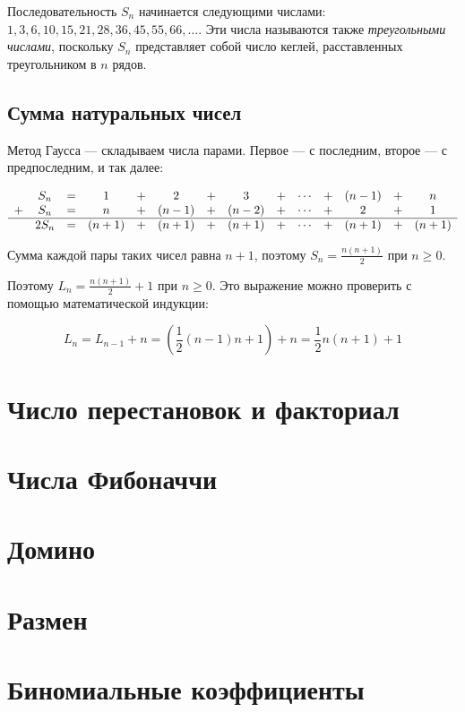 \documentclass[14pt]{book}
\begin{document}
Последовательность $S_n$ начинается следующими числами: $1, 3, 6, 10, 15, 21, 28, 36, 45, 55, 66, \ldots$.
Эти числа называются также \emph{треугольными числами}, поскольку $S_n$ представляет собой
число кеглей, расставленных треугольником в $n$ рядов.

\subsection{Сумма натуральных чисел}

Метод Гаусса --- складываем числа парами. Первое --- с последним, второе --- с предпоследним,
и так далее:

\begin{equation}
\begin{array}{cccccccccccccc}
  & S_n & = & 1 & + & 2 & + & 3 & + & \cdots & + & (n-1) & + & n \\
+ & S_n & = & n & + & (n-1) & + & (n-2) & + & \cdots & + & 2 & + & 1 \\
\hline
  & 2S_n & = & (n+1) & + & (n+1) & + & (n+1) & + & \cdots & + & (n+1) & + & (n+1)
\end{array}
\end{equation}

Сумма каждой пары таких чисел равна $n+1$, поэтому $S_n = \frac{n(n+1)}{2}$ при $n \ge 0$.

Поэтому $L_n = \frac{n(n+1)}{2} + 1$ при $n \ge 0$.
Это выражение можно проверить с помощью математической индукции:

$$
L_n = L_{n-1} + n = \left(\frac{1}{2}(n-1)n+1 \right)+n = \frac{1}{2}n(n+1) + 1
$$

\section{Число перестановок и факториал}
\section{Числа Фибоначчи}
\section{Домино}
\section{Размен}
\section{Биномиальные коэффициенты}
\end{document}
